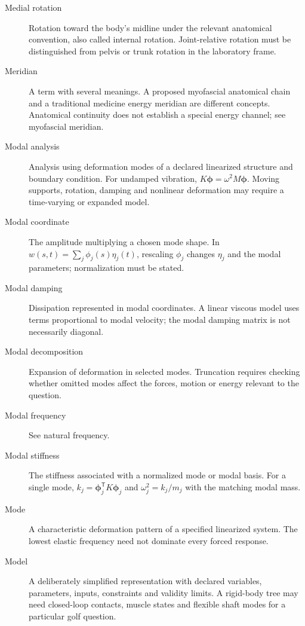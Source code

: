 \begin{description}
\item[Medial rotation] Rotation toward the body's midline under the relevant anatomical convention, also called internal rotation. Joint-relative rotation must be distinguished from pelvis or trunk rotation in the laboratory frame.

\item[Meridian] A term with several meanings. A proposed myofascial anatomical chain and a traditional medicine energy meridian are different concepts. Anatomical continuity does not establish a special energy channel; see myofascial meridian.

\item[Modal analysis] Analysis using deformation modes of a declared linearized structure and boundary condition. For undamped vibration, $K\boldsymbol{\phi}=\omega^2M\boldsymbol{\phi}$. Moving supports, rotation, damping and nonlinear deformation may require a time-varying or expanded model.

\item[Modal coordinate] The amplitude multiplying a chosen mode shape. In $w(s,t)=\sum_j\phi_j(s)\eta_j(t)$, rescaling $\phi_j$ changes $\eta_j$ and the modal parameters; normalization must be stated.

\item[Modal damping] Dissipation represented in modal coordinates. A linear viscous model uses terms proportional to modal velocity; the modal damping matrix is not necessarily diagonal.

\item[Modal decomposition] Expansion of deformation in selected modes. Truncation requires checking whether omitted modes affect the forces, motion or energy relevant to the question.

\item[Modal frequency] See natural frequency.

\item[Modal stiffness] The stiffness associated with a normalized mode or modal basis. For a single mode, $k_j=\boldsymbol{\phi}_j^\mathsf{T}K\boldsymbol{\phi}_j$ and $\omega_j^2=k_j/m_j$ with the matching modal mass.

\item[Mode] A characteristic deformation pattern of a specified linearized system. The lowest elastic frequency need not dominate every forced response.

\item[Model] A deliberately simplified representation with declared variables, parameters, inputs, constraints and validity limits. A rigid-body tree may need closed-loop contacts, muscle states and flexible shaft modes for a particular golf question.


\end{description}
